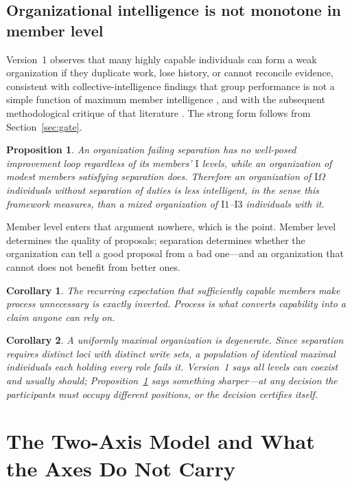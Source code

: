 \documentclass[11pt]{article}
\newtheorem{proposition}{Proposition}
\newtheorem{corollary}{Corollary}
\newcommand{\Ilev}[1]{\ensuremath{\mathrm{I}#1}}
\newcommand{\IOm}{\ensuremath{\mathrm{I}\Omega}}
\begin{document}
\subsection{Organizational intelligence is not monotone in member level}

Version~1 observes that many highly capable individuals can form a weak organization if they duplicate work, lose history, or cannot reconcile evidence, consistent with collective-intelligence findings that group performance is not a simple function of maximum member intelligence \citep{woolley2010collective}, and with the subsequent methodological critique of that literature \citep{crede2017structure}. The strong form follows from Section~\ref{sec:gate}.

\begin{proposition}\label{prop:monotone}
An organization failing separation has no well-posed improvement loop regardless of its members' \Ilev{} levels, while an organization of modest members satisfying separation does. Therefore an organization of \IOm{} individuals without separation of duties is \emph{less} intelligent, in the sense this framework measures, than a mixed organization of \Ilev{1}--\Ilev{3} individuals with it.
\end{proposition}

Member level enters that argument nowhere, which is the point. Member level determines the quality of proposals; separation determines whether the organization can tell a good proposal from a bad one---and an organization that cannot does not benefit from better ones.

\begin{corollary}
The recurring expectation that sufficiently capable members make process unnecessary is exactly inverted. Process is what converts capability into a claim anyone can rely on.
\end{corollary}

\begin{corollary}
A uniformly maximal organization is degenerate. Since separation requires distinct loci with distinct write sets, a population of identical maximal individuals each holding every role fails it. Version~1 says all levels \emph{can} coexist and usually should; Proposition~\ref{prop:monotone} says something sharper---at any decision the participants must occupy different positions, or the decision certifies itself.
\end{corollary}

\section{The Two-Axis Model and What the Axes Do Not Carry}
\end{document}
